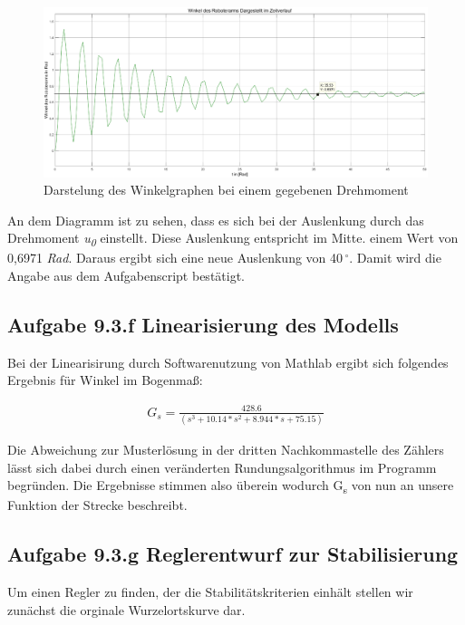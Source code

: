 \documentclass[10pt]{scrartcl}
\begin{document}
\begin{figure}[H]
	\centering
	\includegraphics[width=1.2\textwidth]{Aufgabe9e}
	\caption{Darstelung des Winkelgraphen bei einem gegebenen Drehmoment}
	\label{img:grafik-dummy}
\end{figure}

An dem Diagramm ist zu sehen, dass es sich bei der Auslenkung durch das Drehmoment \textit{u\textsubscript{0}} einstellt. Diese Auslenkung entspricht im Mitte. einem Wert von 0,6971 \textit{Rad}. Daraus ergibt sich eine neue Auslenkung von 40\,$^\circ$. Damit wird die Angabe aus dem Aufgabenscript bestätigt.




\subsection{Aufgabe 9.3.f Linearisierung des Modells}

Bei der Linearisirung durch Softwarenutzung von Mathlab ergibt sich folgendes Ergebnis für Winkel im Bogenmaß:

\begin{align}
   G_s = \frac{428.6}{(s^3 + 10.14*s^2 + 8.944*s + 75.15)} 
\end{align}

Die Abweichung zur Musterlösung in der dritten Nachkommastelle des Zählers lässt sich dabei durch einen veränderten Rundungsalgorithmus im Programm begründen. 
Die Ergebnisse stimmen also überein wodurch G\textsubscript{s} von nun an unsere Funktion der Strecke beschreibt.




\subsection{Aufgabe 9.3.g Reglerentwurf zur Stabilisierung}

Um einen Regler zu finden, der die Stabilitätskriterien einhält stellen wir zunächst die orginale Wurzelortskurve dar.
\end{document}
